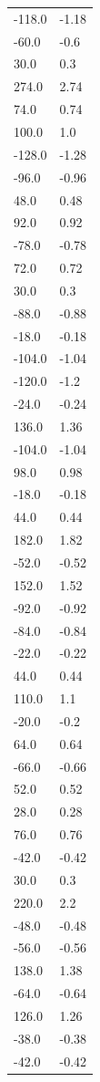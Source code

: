\begin{longtable}{ll}
-118.0 & -1.18 \\
-60.0 & -0.6 \\
30.0 & 0.3 \\
274.0 & 2.74 \\
74.0 & 0.74 \\
100.0 & 1.0 \\
-128.0 & -1.28 \\
-96.0 & -0.96 \\
48.0 & 0.48 \\
92.0 & 0.92 \\
-78.0 & -0.78 \\
72.0 & 0.72 \\
30.0 & 0.3 \\
-88.0 & -0.88 \\
-18.0 & -0.18 \\
-104.0 & -1.04 \\
-120.0 & -1.2 \\
-24.0 & -0.24 \\
136.0 & 1.36 \\
-104.0 & -1.04 \\
98.0 & 0.98 \\
-18.0 & -0.18 \\
44.0 & 0.44 \\
182.0 & 1.82 \\
-52.0 & -0.52 \\
152.0 & 1.52 \\
-92.0 & -0.92 \\
-84.0 & -0.84 \\
-22.0 & -0.22 \\
44.0 & 0.44 \\
110.0 & 1.1 \\
-20.0 & -0.2 \\
64.0 & 0.64 \\
-66.0 & -0.66 \\
52.0 & 0.52 \\
28.0 & 0.28 \\
76.0 & 0.76 \\
-42.0 & -0.42 \\
30.0 & 0.3 \\
220.0 & 2.2 \\
-48.0 & -0.48 \\
-56.0 & -0.56 \\
138.0 & 1.38 \\
-64.0 & -0.64 \\
126.0 & 1.26 \\
-38.0 & -0.38 \\
-42.0 & -0.42 \\

\end{longtable}
